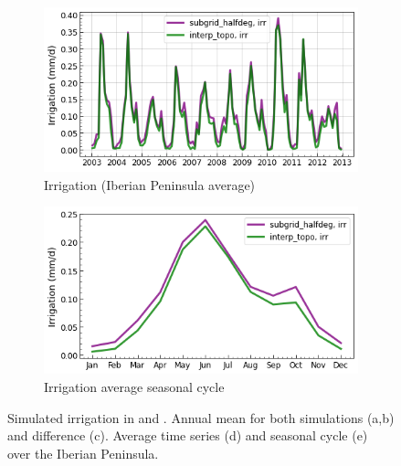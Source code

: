 \begin{figure}[htbp]
    \begin{subfigure}[b]{0.48\textwidth}
        \caption{Irrigation (Iberian Peninsula average)}
        \includegraphics[width=\textwidth]{images/chap3/time_series/irrigation_time_series.png}
    \end{subfigure}    
    \begin{subfigure}[b]{0.48\textwidth}
        \caption{Irrigation average seasonal cycle}
        \includegraphics[width=\textwidth]{images/chap3/time_series/irrigation_seasonal_cycle.png}
    \end{subfigure}

    \caption{Simulated irrigation in \std and \native. Annual mean for both simulations (a,b) and difference (c). Average time series (d) and seasonal cycle (e) over the Iberian Peninsula.}
    \label{fig:irrigation_halfdeg_eval}
\end{figure}

